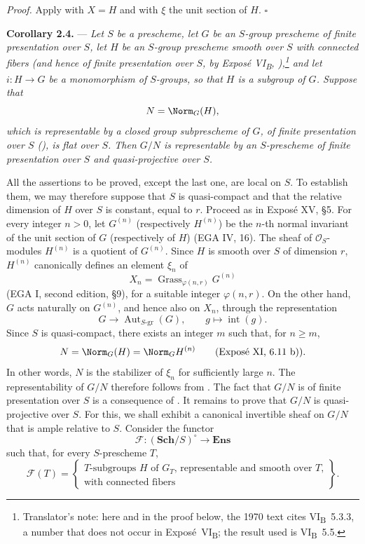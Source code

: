 \medskip
\noindent\textit{Proof.}
Apply  with \(X=H\) and with \(\xi\) the unit section of \(H\).
\hfill\(\square\)

\medskip
\noindent{}%
\textbf{Corollary 2.4.} --- \textit{Let \(S\) be a prescheme, let
\(G\) be an \(S\)-group prescheme of finite presentation over
\(S\), let \(H\) be an \(S\)-group prescheme smooth over \(S\) with
connected fibers (and hence of finite presentation over \(S\), by
Exposé VI\textsubscript{B}, ),\footnote{Translator's note: here and in
the proof below, the 1970 text cites VI\textsubscript{B}~5.3.3, a number that does not occur in
Exposé~VI\textsubscript{B}; the result used is VI\textsubscript{B}~5.5.} and let \(i:H\to G\) be a
monomorphism of \(S\)-groups, so that \(H\) is a subgroup of \(G\).
Suppose that}
\[
  N=\Norm_G(H),
\]
\textit{which is representable by a closed group subprescheme of
\(G\), of finite presentation over \(S\) (), is flat
over \(S\). Then \(G/N\) is representable by an \(S\)-prescheme of
finite presentation over \(S\) and quasi-projective over \(S\).}

All the assertions to be proved, except the last one, are local on
\(S\). To establish them, we may therefore suppose that \(S\) is
quasi-compact and that the relative dimension of \(H\) over \(S\)
is constant, equal to \(r\). Proceed as in Exposé XV, \S5. For every
integer \(n>0\), let \(G^{(n)}\) (respectively \(H^{(n)}\)) be the
\(n\)-th normal invariant of the unit section of \(G\)
(respectively of \(H\)) (EGA IV, 16). The sheaf of
\(\mathcal O_S\)-modules \(H^{(n)}\) is a quotient of \(G^{(n)}\).
Since \(H\) is smooth over \(S\) of dimension \(r\), \(H^{(n)}\)
canonically defines an element \(\xi_n\) of
\[
  X_n=\operatorname{Grass}_{\varphi(n,r)}G^{(n)}
\]
(EGA I, second edition, \S9), for a suitable integer
\(\varphi(n,r)\). On the other hand, \(G\) acts naturally on
\(G^{(n)}\), and hence also on \(X_n\), through the representation
\[
  G\longrightarrow\operatorname{Aut}_{S\text{-gr}}(G),
  \qquad g\longmapsto\operatorname{int}(g).
\]
Since \(S\) is quasi-compact, there exists an integer \(m\) such
that, for \(n\geq m\),
\[
  N=\Norm_G(H)=\Norm_G H^{(n)}
  \qquad\text{(Exposé XI, 6.11 b)).}
\]
In other words, \(N\) is the stabilizer of \(\xi_n\) for sufficiently
large \(n\). The representability of \(G/N\) therefore follows from
. The fact that \(G/N\) is of finite presentation over \(S\) is
a consequence of . It remains to prove that \(G/N\) is
quasi-projective over \(S\). For this, we shall exhibit a canonical
invertible sheaf on \(G/N\) that is ample relative to \(S\).
Consider the functor
\[
  \mathscr F:(\mathbf{Sch}/S)^\circ\longrightarrow\mathbf{Ens}
\]
such that, for every \(S\)-prescheme \(T\),
\[
  \mathscr F(T)=
  \left\{
  \begin{array}{c}
  \text{\(T\)-subgroups \(H\) of \(G_T\), representable and smooth
  over \(T\),}\\
  \text{with connected fibers}
  \end{array}
  \right\}.
\]

